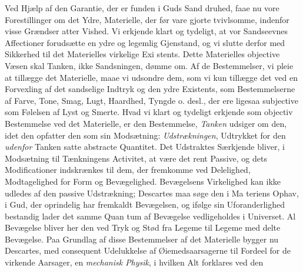 \documentclass[12pt,a4paper]{book}
\begin{document}
Ved Hjælp af den Garantie, der er funden i Guds Sand\-%
druhed, faae nu vore Forestillinger om det Ydre, Materielle,
der før vare gjorte tvivlsomme, indenfor visse Grændser atter
Vished. Vi erkjende klart og tydeligt, at vor Sandseevnes
Affectioner forudsætte en ydre og legemlig Gjenstand, og vi
slutte derfor med Sikkerhed til det Materielles virkelige Exi\-%
stents. Dette Materielles objective Væsen skal Tanken, ikke
Sandsningen, dømme om. Af de Bestemmelser, vi pleie at
tillægge det Materielle, maae vi udsondre dem, som vi kun
tillægge det ved en Forvexling af det sandselige Indtryk og den
ydre Existents, som Bestemmelserne af Farve, Tone, Smag,
Lugt, Haardhed, Tyngde o. desl., der ere ligesaa subjective
som Følelsen af Lyst og Smerte. Hvad vi klart og tydeligt
erkjende som objectiv Bestemmelse ved det Materielle, er den
Bestemmelse, \emph{Tanken} udsiger om den, idet den opfatter den
som sin Modsætning: \emph{Udstrækningen}, Udtrykket for den
\emph{udenfor} Tanken satte abstracte Quantitet. Det Udstraktes
Særkjende bliver, i Modsætning til Tænkningens Activitet, at
være det rent Passive, og dets Modificationer indskrænkes til
dem, der fremkomme ved Delelighed, Modtagelighed for Form
og Bevægelighed. Bevægelsens Virkelighed kan ikke udledes
af den passive Udstrækning; Descartes maa søge den i Ma\-%
teriens Ophav, i Gud, der oprindelig har fremkaldt Bevægelsen,
og ifølge sin Uforanderlighed bestandig lader det samme Quan\-%
tum af Bevægelse vedligeholdes i Universet. Al Bevægelse
bliver her den ved Tryk og Stød fra Legeme til Legeme med\-%
delte Bevægelse. Paa Grundlag af disse Bestemmelser af det
Materielle bygger nu Descartes, med consequent Udelukkelse
af Øiemedsaarsagerne til Fordeel for de virkende Aarsager,
en \emph{mechanisk Physik}, i hvilken Alt forklares ved den
\end{document}
